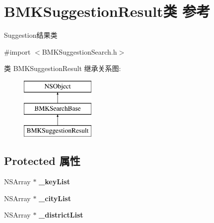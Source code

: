 \hypertarget{interface_b_m_k_suggestion_result}{}\section{B\+M\+K\+Suggestion\+Result类 参考}
\label{interface_b_m_k_suggestion_result}


Suggestion结果类  




{\ttfamily \#import $<$B\+M\+K\+Suggestion\+Search.\+h$>$}

类 B\+M\+K\+Suggestion\+Result 继承关系图\+:\begin{figure}[H]
\begin{center}
\leavevmode
\includegraphics[height=3.000000cm]{interface_b_m_k_suggestion_result}
\end{center}
\end{figure}
\subsection*{Protected 属性}
\begin{DoxyCompactItemize}
\item 
\hypertarget{interface_b_m_k_suggestion_result_af33171b4e254408d71e6e6904ff361a1}{}N\+S\+Array $\ast$ {\bfseries \+\_\+key\+List}\label{interface_b_m_k_suggestion_result_af33171b4e254408d71e6e6904ff361a1}

\item 
\hypertarget{interface_b_m_k_suggestion_result_a6b3b6f1702dbb6acbe1d77e71d5b07b5}{}N\+S\+Array $\ast$ {\bfseries \+\_\+city\+List}\label{interface_b_m_k_suggestion_result_a6b3b6f1702dbb6acbe1d77e71d5b07b5}

\item 
\hypertarget{interface_b_m_k_suggestion_result_a0d6c54df02825f8166ff6c55c95b8770}{}N\+S\+Array $\ast$ {\bfseries \+\_\+district\+List}\label{interface_b_m_k_suggestion_result_a0d6c54df02825f8166ff6c55c95b8770}

\end{DoxyCompactItemize}
